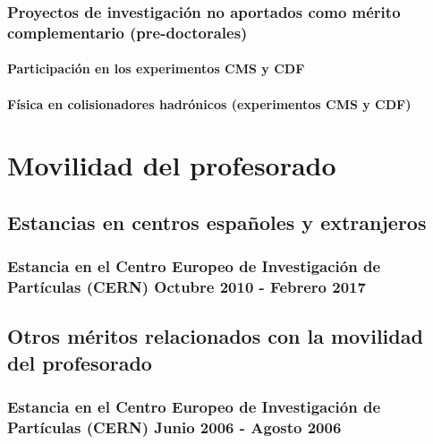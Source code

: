 \documentclass[a4paper, 11pt, twoside, openright]{report}
\begin{document}
\subsubsection{Proyectos de investigación no aportados como mérito complementario (pre-doctorales)}

\paragraph{Participación en los experimentos CMS y CDF}


\paragraph{Física en colisionadores hadrónicos (experimentos CMS y CDF)}




\section{Movilidad del profesorado}

\subsection{Estancias en centros españoles y extranjeros}

\subsubsection{Estancia en el Centro Europeo de Investigación de Partículas (CERN) Octubre 2010 - Febrero 2017}



\subsection{Otros méritos relacionados con la movilidad del profesorado}

\subsubsection{Estancia en el Centro Europeo de Investigación de Partículas (CERN) Junio 2006 - Agosto 2006}

\end{document}
